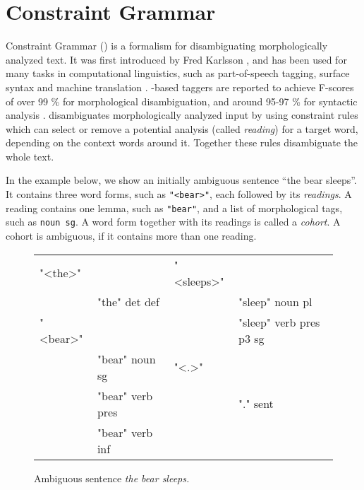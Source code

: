 \newcommand{\quality}[1]{${\tt Quality_{#1}}$}
\newcommand{\kind}[1]{${\tt Kind_{#1}}$}
\newcommand{\very}[1]{${\tt Very_{#1}}$}
\newcommand{\comment}{${\tt Comment}$}
\newcommand{\modFun}[2]{${\tt Mod_{#1,#2}}$}
\newcommand{\predFun}[3]{${\tt Pred_{#1,#2,#3}}$}
\newcommand{\itemSpa}[2]{${\tt Item_{#1,#2}}$}
\newcommand{\itemEng}[1]{${\tt Item_{#1}}$}
\def\t#1{\texttt{#1}}

\section{Constraint Grammar}
\label{sec:cg-intro}

Constraint Grammar (\onlycg{}) is a formalism for 
disambiguating morphologically analyzed text. 
It was first introduced by Fred Karlsson  
\cite{karlsson1990cgp,karlsson1995constraint}, and has been used for
many tasks in computational linguistics, such as part-of-speech
tagging, surface syntax and machine translation \cite{bick2011}.
\onlycg{}-based taggers are reported to achieve F-scores of over 99 \% for
morphological disambiguation, and around 95-97 \% for syntactic analysis
\cite{bick2000palavras,bick2003hybridCG_PSG,bick2006spanish}. 
\onlycg{} disambiguates morphologically analyzed input by using constraint
rules which can select or remove a potential analysis (called
\emph{reading}) for a target word, depending on the context words
around it.  Together these rules disambiguate the whole text.


In the example below, we show an initially ambiguous sentence ``the bear
sleeps''. 
It contains three word forms, such as \t{"<bear>"}, each followed by its \emph{readings}.
A reading contains one lemma, such as \t{"bear"}, and a list of morphological tags, such as \t{noun sg}.
A word form together with its readings is called a \emph{cohort}. A cohort is ambiguous, if it contains more than one reading.

\begin{figure}[h]
\centering
\ttfamily
\begin{tabular}{p{0.6cm} l  p{0.6cm} l}
"<the>"  &                & "<sleeps>"        \\
    & "the" det def       &     & "sleep" noun pl \\
"<bear>" &                &     & "sleep" verb pres p3 sg \\
    & "bear" noun sg      & "<.>"                   \\
    & "bear" verb pres    &     & "." sent          \\
    & "bear" verb inf \\
\end{tabular}
\label{fig:theBearSleeps}
\caption{Ambiguous sentence {\em the bear sleeps.}}
\end{figure}


